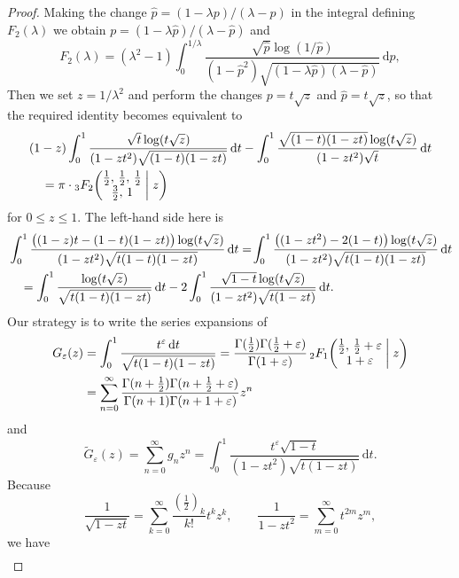 \documentclass[12pt,reqno]{amsart}
\theoremstyle{remark}
\let\eps\varepsilon
\begin{document}
\begin{proof}
Making the change $\hat p=(1-\lambda p)/(\lambda-p)$ in the integral defining $F_2(\lambda)$
we obtain $p=(1-\lambda\hat p)/(\lambda-\hat p)$ and
$$
F_2(\lambda)
=(\lambda^2-1)\int_0^{1/\lambda}\frac{\sqrt{\hat p}\log(1/\hat p)}
{(1-\hat p^2)\sqrt{(1-\lambda\hat p)(\lambda-\hat p)}}\,{{\mathrm d}}\hat p,
$$
Then we set $z=1/\lambda^2$ and perform the changes $p=t\sqrt z$ and $\hat p=t\sqrt z$,
so that the required identity becomes equivalent to
\begin{align}
&
(1-z)\int_0^1\frac{\sqrt t\log(t\sqrt z)}{(1-zt^2)\sqrt{(1-t)(1-zt)}}\,{{\mathrm d}} t
-\int_0^1\frac{\sqrt{(1-t)(1-zt)}\log(t\sqrt z)}{(1-zt^2)\sqrt t}\,{{\mathrm d}} t
\notag\\ &\quad
=\pi\cdot{}_3F_2\biggl(\begin{matrix} \frac12, \, \frac12, \, \frac12 \\ \frac32, \, 1 \end{matrix}\biggm| z\biggr)
\label{identity-a}
\end{align}
for $0\le z\le1$. The left-hand side here is
\begin{align}
&
\int_0^1\frac{\bigl((1-z)t-(1-t)(1-zt)\bigr)\log(t\sqrt z)}{(1-zt^2)\sqrt{t(1-t)(1-zt)}}\,{{\mathrm d}} t
=\!\int_0^1\frac{\bigl((1-zt^2)-2(1-t)\bigr)\log(t\sqrt z)}{(1-zt^2)\sqrt{t(1-t)(1-zt)}}\,{{\mathrm d}} t
\notag\\ &\quad
=\int_0^1\frac{\log(t\sqrt z)}{\sqrt{t(1-t)(1-zt)}}\,{{\mathrm d}} t
-2\int_0^1\frac{\sqrt{1-t}\log(t\sqrt z)}{(1-zt^2)\sqrt{t(1-zt)}}\,{{\mathrm d}} t.
\label{lhs-id}
\end{align}
Our strategy is to write the series expansions of
\begin{align*}
G_\eps(z)
&=\int_0^1\frac{t^\eps\,{{\mathrm d}} t}{\sqrt{t(1-t)(1-zt)}}
=\frac{\Gamma(\frac12)\Gamma(\frac12+\eps)}{\Gamma(1+\eps)}
\,{}_2F_1\biggl(\begin{matrix} \frac12, \, \frac12+\eps \\ 1+\eps \end{matrix}\biggm| z\biggr)
\\
&=\sum_{n=0}^\infty\frac{\Gamma(n+\frac12)\Gamma(n+\frac12+\eps)}{\Gamma(n+1)\Gamma(n+1+\eps)}z^n
\end{align*}
and
$$
\tilde G_\eps(z)=\sum_{n=0}^\infty g_nz^n=\int_0^1\frac{t^\eps\sqrt{1-t}}{(1-zt^2)\sqrt{t(1-zt)}}\,{{\mathrm d}} t.
$$
Because
$$
\frac1{\sqrt{1-zt}}=\sum_{k=0}^\infty\frac{(\frac12)_k}{k!}t^kz^k,
\qquad
\frac1{1-zt^2}=\sum_{m=0}^\infty t^{2m}z^m,
$$
we have
\begin{align*}

\end{align*}
\end{proof}
\end{document}

